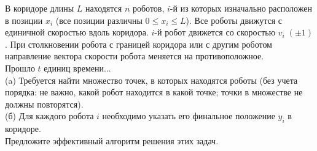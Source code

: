 \documentclass{article}
\begin{document}
В коридоре длины $L$ находятся $n$ роботов, $i$-й из которых изначально расположен в позиции $x_i$ 
(все позиции различны $0 \leqslant x_i \leqslant L$). Все роботы движутся с единичной скоростью вдоль коридора. $i$-й робот движется со скоростью $v_i\; (\pm 1)$. При столкновении робота с границей коридора или с другим роботом направление вектора скорости робота меняется на противоположное.\\
Прошло $t$ единиц времени...\\
(a) Требуется найти множество точек, в которых находятся роботы (без учета порядка: не важно, какой робот находится в какой точке; точки в множестве не должны повторятся).\\
(б) Для каждого робота $i$ необходимо указать его финальное положение $y_i$ в коридоре.\\
Предложите эффективный алгоритм решения этих задач.
\end{document}
